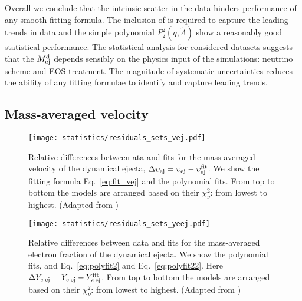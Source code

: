 Overall we conclude that the intrinsic scatter in the data hinders performance 
of any smooth fitting formula. The inclusion of \mr{} is required to capture the leading 
trends in data and the simple polynomial $P_2^2(q,\tilde{\Lambda})$ show a reasonably 
good statistical performance.
%
The statistical analysis for considered datasets suggests that the $M^{\text{d}}_{\text{ej}}$ depends 
sensibly on the physics input of the simulations: neutrino scheme and \ac{EOS} treatment.
The magnitude of systematic uncertainties reduces the ability of any fitting formulae 
to identify and capture leading trends.




\subsection{Mass-averaged velocity}\label{sec:stat:vejstat}

\begin{figure}[t]
    \centering 
    \texttt{[image: statistics/residuals\_sets\_vej.pdf]}
    \caption{
        Relative differences between ata and fits for the mass-averaged velocity of the dynamical ejecta, $\Delta \upsilon_{\rm ej} = \upsilon_{\rm ej} - \upsilon^{\rm fit}_{\rm ej}$.
        We show the fitting formula Eq.~\eqref{eq:fit_vej} and the polynomial fits.
        From top to bottom the models are arranged based on their $\chi_{\nu}^2$: from lowest to highest.
        (Adapted from \citet{Nedora:2020qtd})
    }
    \label{fig:ejecta:dyn:v}
\end{figure}

\begin{figure}[t]
    \centering 
    \texttt{[image: statistics/residuals\_sets\_yeej.pdf]}
    \caption{
        Relative differences between data and fits for the 
        mass-averaged electron fraction of the dynamical ejecta.
        We show the polynomial fits, and Eq.~\eqref{eq:polyfit2} and Eq.~\eqref{eq:polyfit22}.
        Here $\Delta Y_{e\: \rm ej} = Y_{e\: \rm ej} - Y^{\rm fit}_{e\: \rm ej}$.
        From top to bottom the models are arranged based on their $\chi_{\nu}^2$: 
        from lowest to highest.
        (Adapted from \citet{Nedora:2020qtd})
    }
    \label{fig:ejecta:dyn:y}
\end{figure}

